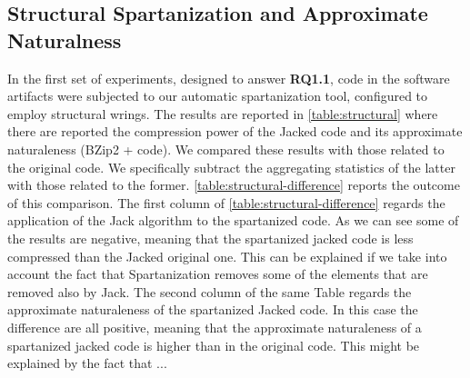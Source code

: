 \subsection{Structural Spartanization and Approximate Naturalness}

In the first set of experiments, designed to answer \textbf{RQ1.1}, \Java code
in the software artifacts were subjected to our automatic spartanization
tool, configured to employ structural wrings. 
The results are reported in \cref{table:structural} where there are reported 
the compression power of the Jacked code and its approximate 
naturaleness (BZip2 + code). 
We compared these results %
with those related to the original code.
We specifically subtract the aggregating statistics of the latter with those related to the former.
\cref{table:structural-difference} reports the outcome of this comparison. 
The first column of \cref{table:structural-difference} regards the application of the Jack algorithm to the spartanized code. 
As we can see some of the results are negative, meaning that the spartanized jacked code is less compressed 
than the Jacked original one. 
This can be explained if we take into account the fact that Spartanization removes some 
of the elements that are removed also by Jack.
The second column of the same Table regards the approximate naturaleness of the spartanized Jacked code.
In this case the difference are all positive, meaning that the approximate naturaleness of 
a spartanized jacked code is higher than in the original code.
This might be explained by the fact that ...




